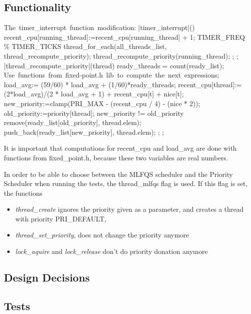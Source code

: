     \subsection{Functionality}

	\begin{program}
	\mbox{The timer\_interrupt function modification:}     
	\PROC |timer\_interrupt|() \BODY
		recent\_cpu[running\_thread]:=recent\_cpu[running\_thread] + 1;
		\IF TIMER\_FREQ \% TIMER\_TICKS  
		      \THEN thread\_for\_each(all\_threads\_list, thread\_recompute\_priority); 
		      \ELSE thread\_recompute\_priority(running\_thread);
		\FI;
	\END;
	\PROC |thread\_recompute\_priority|(thread) \BODY
		ready\_threads = count(ready\_list);
		\mbox{Use functions from fixed-point.h lib to compute the next expressions};
		load\_avg:= (59/60) * load\_avg + (1/60)*ready_threads; 
		recent\_cpu[thread]:= (2*load\_avg)/(2 * load\_avg + 1) + recent\_cpu[t] + nice[t];
		new\_priority:=clamp(PRI\_MAX - (recent\_cpu / 4) - (nice * 2));
		old\_priority:=priority[thread];
		\IF new\_priority != old\_priority
		      \THEN remove(ready\_list[old\_priority], thread.elem);
			    push\_back(ready\_list[new\_priority], thread.elem);
		\FI;
	\END;
	\end{program}

	It is important that computations for recent\_cpu and load\_avg are done with functions from fixed\_point.h, because these two variables are real numbers.

	In order to be able to choose between the MLFQS scheduler and the Priority Scheduler when running the tests, the thread\_mlfqs flag is used. If this flag is set, the functions 
	\begin{itemize}
	  \item \textit{thread\_create} ignores the priority given as a parameter, and creates a thread with priority PRI\_DEFAULT,
	  \item \textit{thread\_set\_priority}, does not change the priority anymore
	  \item \textit{lock\_aquire} and \textit{lock\_release} don't do priority donation anymore
	\end{itemize}

    \subsection{Design Decisions}


    \subsection{Tests}

	